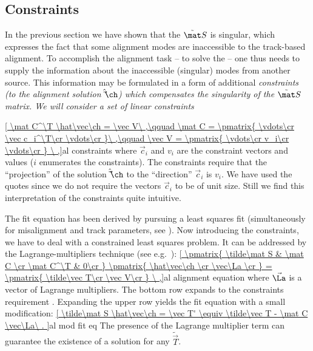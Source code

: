 \subsection[al constr]{Constraints}

In the previous section we have shown that the $\tilde\mat S$ is singular, which expresses the fact that some alignment modes are inaccessible to the track-based alignment. To accomplish the alignment task -- to solve the  -- one thus needs to supply the information about the inaccessible (singular) modes from another source. This information may be formulated in a form of additional \em{constraints} (to the alignment solution $\hat\vec\ch$) which compensates the singularity of the $\tilde\mat S$ matrix. We will consider a set of linear constraints

\eqref{
	\mat C^\T \hat\vec\ch = \vec V\ ,\qquad
	\mat C = \pmatrix{
		\vdots\cr
		\vec c_i^\T\cr
		\vdots\cr
	}\ ,\qquad
	\vec V = \pmatrix{
		\vdots\cr
		v_i\cr
		\vdots\cr
	}
\ ,}{al constraints}
where $\vec c_i$ and $v_i$ are the constraint vectors and values ($i$ enumerates the constraints). The constraints require that the ``projection'' of the solution $\hat\vec\ch$ to the ``direction'' $\vec c_i$ is $v_i$. We have used the quotes since we do not require the vectors $\vec c_i$ to be of unit size. Still we find this interpretation of the constraints quite intuitive.

The fit equation  has been derived by pursuing a least squares fit (simultaneously for misalignment and track parameters, see ). Now introducing the constraints, we have to deal with a constrained least squares problem. It can be addressed by the Lagrange-multipliers technique (see e.g.~):
\eqref{
	\pmatrix{
		\tilde\mat S & \mat C \cr
		\mat C^\T & 0\cr
	}
	\pmatrix{
		\hat\vec\ch \cr
		\vec\La \cr
	}
	=
	\pmatrix{
		\tilde\vec T\cr
		\vec V\cr
	}
\ ,}{al alignment equation}
where $\vec\La$ is a vector of Lagrange multipliers. The bottom row expands to the constraints requirement . Expanding the upper row yields the fit equation  with a small modification:
\eqref{
	\tilde\mat S \hat\vec\ch = \vec T' \equiv \tilde\vec T - \mat C \vec\La\ .
}{al mod fit eq}
The presence of the Lagrange multiplier term can guarantee the existence of a solution for any $\tilde\vec T$.

